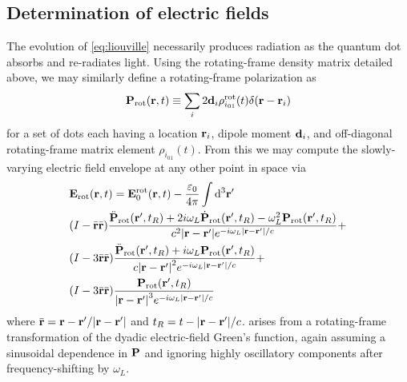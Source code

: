\documentclass[conference]{IEEEtran}
\begin{document}
\subsection{Determination of electric fields}
The evolution of \cref{eq:liouville} necessarily produces radiation as the quantum dot absorbs and re-radiates light.
Using the rotating-frame density matrix detailed above, we may similarly define a rotating-frame polarization as
\begin{equation}
  \vb{P}_\text{rot}(\vb{r}, t) \equiv \sum_i 2\vb{d}_i \rho_{i_{01}}^\text{rot}(t) \delta(\vb{r} - \vb{r}_i)
  \label{eq:polarization}
\end{equation}
for a set of dots each having a location $\vb{r}_i$, dipole moment $\vb{d}_i$, and off-diagonal rotating-frame matrix element $\rho_{i_{01}}(t)$.
From this we may compute the slowly-varying electric field envelope at any other point in space via
\begin{equation}
  \begin{aligned}
    & \vb{E}_\text{rot}(\vb{r}, t) = \vb{E}_0^\text{rot}(\vb{r}, t) - \frac{\varepsilon_0}{4\pi} \int \dd[3]{\vb{r}'} \\
    & \qty(I - \bar{\vb{r}}\bar{\vb{r}}) \frac{\ddot{\vb{P}}_\text{rot}(\vb{r}', t_R) + 2 i \omega_L \dot{\vb{P}}_\text{rot}(\vb{r}', t_R) - \omega_L^2 \vb{P}_\text{rot}(\vb{r}', t_R)}{c^2 \abs{\vb{r} - \vb{r}'} e^{-i \omega_L \abs{\vb{r} - \vb{r}'}/c}} + \\
    & \qty(I - 3\bar{\vb{r}}\bar{\vb{r}}) \frac{\ddot{\vb{P}}_\text{rot}(\vb{r}', t_R) + i \omega_L \vb{P}_\text{rot}(\vb{r}', t_R)}{c \abs{\vb{r} - \vb{r}'}^2 e^{-i \omega_L \abs{\vb{r} - \vb{r}'}/c}} + \\
    & \qty(I - 3\bar{\vb{r}}\bar{\vb{r}}) \frac{\vb{P}_\text{rot}(\vb{r}', t_R)}{\abs{\vb{r} - \vb{r}'}^3 e^{-i \omega_L \abs{\vb{r} - \vb{r}'}/c}}
  \label{eq:efield}
  \end{aligned}
\end{equation}
where $\bar{\vb{r}} = \vb{r} - \vb{r}'/\abs{\vb{r} - \vb{r}'}$ and $t_R = t - \abs{\vb{r} - \vb{r}'}/c$.
 arises from a rotating-frame transformation of the dyadic electric-field Green's function, again assuming a sinusoidal dependence in $\vb{P}$ and ignoring highly oscillatory components after frequency-shifting by $\omega_L$.
\end{document}
